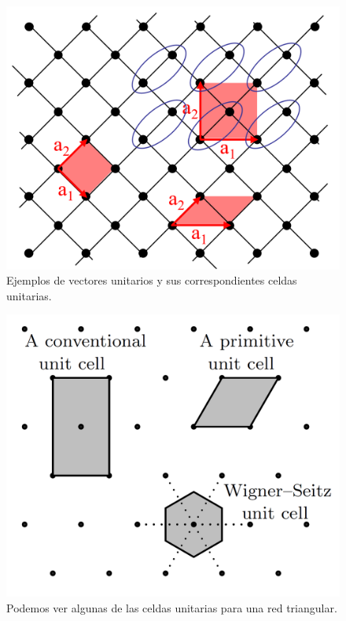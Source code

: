 \begin{figure}[h!] \centering
    \includegraphics[scale=0.5]{Cuerpo/Ch_01/celda.png}
    \caption{Ejemplos de vectores unitarios y sus correspondientes celdas unitarias.}
    \label{Fig:01-01}
\end{figure}

\begin{figure}[h!] \centering
\includegraphics[scale=0.35]{Cuerpo/Ch_01/Celdas.png}
\caption{Podemos ver algunas de las celdas unitarias para una red triangular.}
\label{Fig:01-011}
\end{figure}

